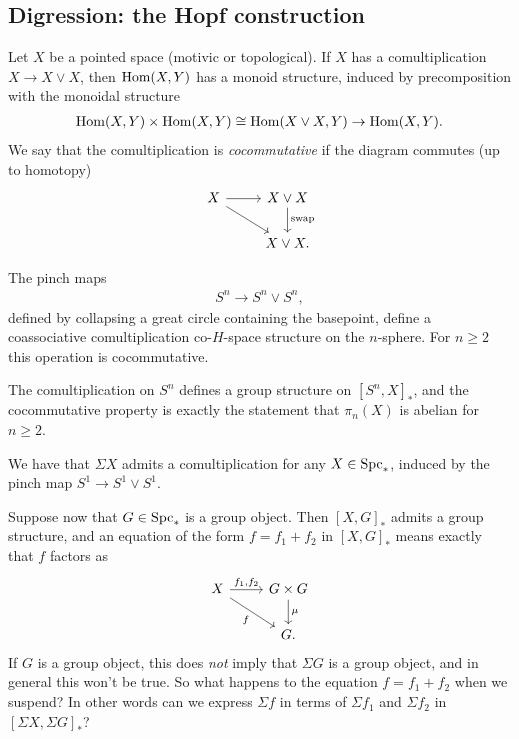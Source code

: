 \documentclass[11pt,openany]{book}
\begin{document}
\subsection{Digression: the Hopf construction}

Let $X$ be a pointed space (motivic or topological). If $X$ has a comultiplication $X \to X \vee X$, then $\mathrm{Hom}(X,Y)$ has a monoid structure, induced by precomposition with the monoidal structure
\begin{align*}
    \mathrm{Hom}(X,Y) \times \mathrm{Hom}(X,Y) \cong \mathrm{Hom}(X \vee X,Y) \to \mathrm{Hom}(X,Y).
\end{align*}
%
We say that the comultiplication is \textit{cocommutative} if the diagram commutes (up to homotopy)
\[ \begin{tikzcd}
    X\rar\ar[dr] & X \vee X\dar["\text{swap}" right]\\
     & X\vee X.
\end{tikzcd} \]
%
\begin{example} The pinch maps
\begin{align*}
    S^n \to S^n \vee S^n,
\end{align*}
defined by collapsing a great circle containing the basepoint, define a coassociative comultiplication co-$H$-space structure on the $n$-sphere. For $n\ge2$ this operation is cocommutative.
\end{example}

The comultiplication on $S^n$ defines a group structure on $\left[ S^n,X \right]_\ast$, and the cocommutative property is exactly the statement that $\pi_n(X)$ is abelian for $n\ge 2$.

\begin{example} We have that $\Sigma X$ admits a comultiplication for any $X \in \mathrm{Spc}_\ast$, induced by the pinch map $S^1 \to S^1 \vee S^1$.
\end{example}

Suppose now that $G \in \mathrm{Spc}_\ast$ is a group object. Then $\left[ X,G \right]_\ast$ admits a group structure, and an equation of the form $f = f_1 + f_2$ in $\left[ X,G \right]_\ast$ means exactly that $f$ factors as
\[ \begin{tikzcd}
    X\rar["{f_1,f_2}" above]\ar[dr,"f" below left] & G \times G\dar["\mu" right]\\
     & G.
\end{tikzcd} \]
%
If $G$ is a group object, this does \textit{not} imply that $\Sigma G$ is a group object, and in general this won't be true. So what happens to the equation $f = f_1 + f_2$ when we suspend? In other words can we express $\Sigma f$ in terms of $\Sigma f_1$ and $\Sigma f_2$ in $\left[ \Sigma X, \Sigma G \right]_\ast$?
\end{document}
